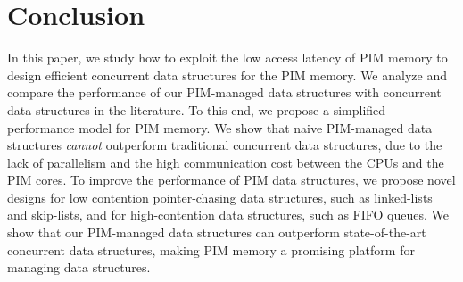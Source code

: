 \section{Conclusion}
\label{section:conclusion}
In this paper, we study how to exploit the low access latency 
of PIM memory to design efficient concurrent data structures for the PIM memory.
We analyze and compare the performance of our PIM-managed data structures with 
concurrent data structures in the literature.
To this end, we propose a simplified performance model for PIM memory. 
We show that naive PIM-managed data structures \emph{cannot} outperform traditional concurrent data structures, 
due to the lack of parallelism and the high communication cost between the CPUs and the PIM cores.  
To improve the performance of PIM data structures, we propose novel designs for low contention 
pointer-chasing data structures, such as linked-lists and skip-lists, and for high-contention  
data structures, such as FIFO queues. 
We show that our PIM-managed data structures can outperform state-of-the-art concurrent 
data structures, making PIM memory a promising platform for managing data structures.

 